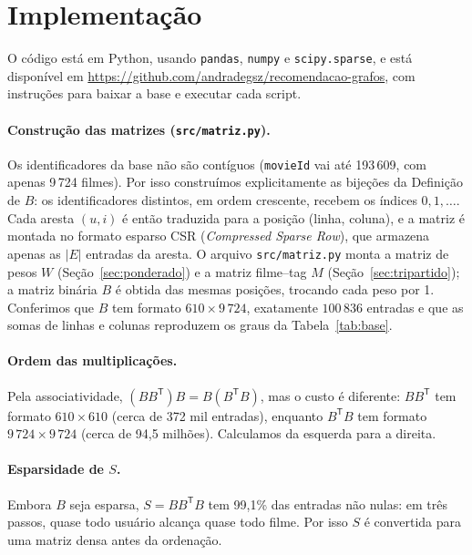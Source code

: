 \documentclass[12pt,a4paper]{article}
\theoremstyle{definition}
\begin{document}
\section{Implementação}\label{sec:implementacao}

O código está em Python, usando \texttt{pandas}, \texttt{numpy} e
\texttt{scipy.sparse}, e está disponível em
\url{https://github.com/andradegsz/recomendacao-grafos}, com instruções
para baixar a base e executar cada script.

\paragraph{Construção das matrizes (\texttt{src/matriz.py}).}
Os identificadores da base não são contíguos (\texttt{movieId} vai até
193\,609, com apenas 9\,724 filmes). Por isso construímos explicitamente as
bijeções da Definição de $B$: os identificadores distintos, em ordem
crescente, recebem os índices $0, 1, \dots$. Cada aresta $(u, i)$ é então
traduzida para a posição (linha, coluna), e a matriz é montada no formato
esparso CSR (\emph{Compressed Sparse Row}), que armazena apenas as $|E|$
entradas da aresta. O arquivo \texttt{src/matriz.py} monta a matriz de
pesos $W$ (Seção~\ref{sec:ponderado}) e a matriz filme--tag $M$
(Seção~\ref{sec:tripartido}); a matriz binária $B$ é obtida das mesmas
posições, trocando cada peso por 1. Conferimos que $B$ tem formato
$610 \times 9\,724$, exatamente $100\,836$ entradas e que as somas de
linhas e colunas reproduzem os graus da Tabela~\ref{tab:base}.

\paragraph{Ordem das multiplicações.}
Pela associatividade, $(BB^{\mathsf T})B = B(B^{\mathsf T}B)$, mas o custo é
diferente: $BB^{\mathsf T}$ tem formato $610 \times 610$ (cerca de 372 mil
entradas), enquanto $B^{\mathsf T}B$ tem formato $9\,724 \times 9\,724$
(cerca de 94{,}5 milhões). Calculamos da esquerda para a direita.

\paragraph{Esparsidade de $S$.}
Embora $B$ seja esparsa, $S = BB^{\mathsf T}B$ tem 99{,}1\% das entradas não
nulas: em três passos, quase todo usuário alcança quase todo filme. Por isso
$S$ é convertida para uma matriz densa antes da ordenação.
\end{document}
